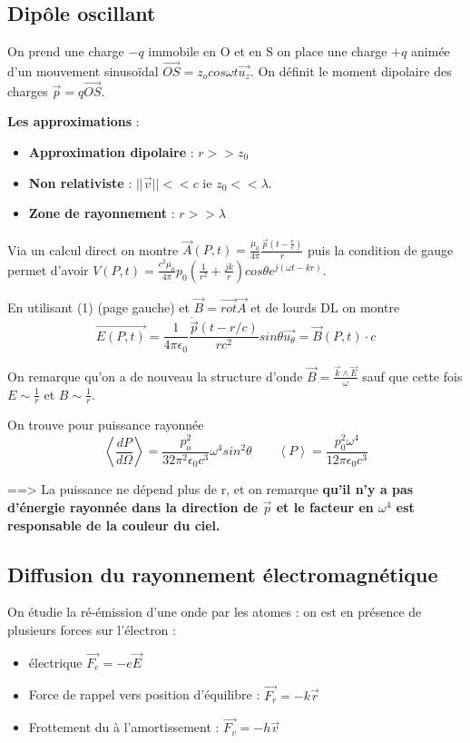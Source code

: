 \documentclass[9pt]{article}
\begin{document}
\begin{multicols*}{2}
\subsection{Dipôle oscillant}
On prend une charge $-q$ immobile en O et en S on place une charge $+q$ animée d'un mouvement sinusoïdal $\overrightarrow{OS}=z_o cos \omega t \overrightarrow{u_z}$. On définit le moment dipolaire des charges $\overrightarrow{p} = q \overrightarrow{OS}$.

\textbf{Les approximations} :
\begin{itemize}
  \item \textbf{Approximation dipolaire} : $r>>z_0$
  \item \textbf{Non relativiste} : $||\overrightarrow{v}|| << c$ ie $z_0 << \lambda$.
  \item \textbf{Zone de rayonnement} : $r >> \lambda$
\end{itemize}

Via un calcul direct on montre $\overrightarrow{A}(P,t) = \frac{\mu_0}{4\pi}\frac{\dot{\overrightarrow{p}}(t-\frac{r}{c})}{r}$
puis la condition de gauge permet d'avoir $V(P,t) = \frac{c^2\mu_0}{4\pi}p_0(\frac{1}{r^2}+\frac{jk}{r})cos \theta e^{j(\omega t - k r)}$.

En utilisant (1) (page gauche) et $\overrightarrow{B} = \overrightarrow{rot}\overrightarrow{A}$ et de lourds DL on montre
$$\overrightarrow{E(P,t)} = \frac{1}{4\pi\epsilon_0}\frac{\ddot{\overrightarrow{p}}(t-r/c)}{rc^2}sin \theta \overrightarrow{u_\theta} = \overrightarrow{B}(P,t)\cdot c$$

On remarque qu'on a de nouveau la structure d'onde $\overrightarrow{B}=\frac{\overrightarrow{k}\wedge \overrightarrow{E}}{\omega}$ sauf que cette fois $E \sim \frac{1}{r}$ et $B \sim \frac{1}{r}$.

On trouve pour puissance rayonnée
$$\left< \frac{dP}{d\Omega} \right> = \frac{p_o^2}{32\pi^2\epsilon_0c^3} \omega^4 sin^2 \theta \qquad \left< P \right> = \frac{p_0^2\omega^4}{12\pi\epsilon_0c^3}$$

==> La puissance ne dépend plus de r, et on remarque \textbf{qu'il n'y a pas d'énergie rayonnée dans la direction de $\overrightarrow{p}$ et le facteur en $\omega^4$ est responsable de la couleur du ciel.}

\subsection{Diffusion du rayonnement électromagnétique}
On étudie la ré-émission d'une onde par les atomes : on est en présence de plusieurs forces sur l'électron :
\begin{itemize}
\item électrique $\overrightarrow{F_e}=-e \overrightarrow{E}$
\item Force de rappel vers position d'équilibre : $\overrightarrow{F_r}=-k \overrightarrow{r}$
\item Frottement du à l'amortissement : $\overrightarrow{F_v}=-h \overrightarrow{v}$
\end{itemize}


\end{multicols*}
\end{document}
